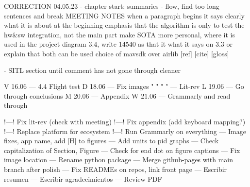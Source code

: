 CORRECTION 04.05.23
 - chapter start: summaries
 - flow, find too long sentences and break
 MEETING NOTES
when a paragraph begins it says clearly what it is about at the beginning
emphasis that the algorithm is only to test the hw&sw integration, not the main part
make SOTA more personal, where it is used in the project
diagram 3.4, write 14540 as that it what it says on 3.3 or explain that both can be used
choice of mavsdk over airlib
[ref] [cite] [gloss]

- SITL section until comment has not gone through cleaner

 

V 16.06 --- 4.4 Flight test
D 18.06 --- Fix images
" " " " --- Lit-rev
L 19.06 --- Go through conclusions
M 20.06 --- Appendix
W 21.06 --- Grammarly and read through

        !---! Fix lit-rev (check with meeting)
        !---! Fix appendix (add keyboard mapping?)
        !---! Replace platform for ecosystem
        !---! Run Grammarly on everything
        --- Image fixes, app name, add [H] to figures
        --- Add units to pid graphs
        --- Check capitalization of Section, Figure
        --- Check for end dot on figure captions
        --- Fix image location
        --- Rename python package
        --- Merge github-pages with main branch after polish
        --- Fix READMEs on repos, link front page
        --- Escribir resumen
        --- Escribir agradecimientos
        --- Review PDF